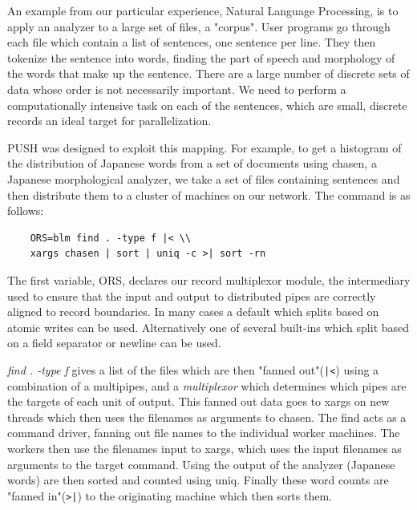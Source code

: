 An example from our particular experience, Natural Language Processing, is
to apply an analyzer to a large set of files, a "corpus". User programs go
through each file which contain a list of sentences, one sentence per line.
They then tokenize the sentence into words, finding the part of speech and
morphology of the words that make up the sentence.
There are a large number of discrete sets of data whose order is not 
necessarily important. We need to perform a computationally intensive task 
on each of the sentences, which are small, discrete records an ideal target 
for parallelization.

PUSH was designed to exploit this mapping. For example, to get a histogram of
the distribution of Japanese words from a set of documents using chasen,
a Japanese morphological analyzer, we take a set of files containing sentences
and then distribute them to a cluster of machines on our network. The command
is as follows:
%
%
\begin{verbatim}
    ORS=blm find . -type f |< \\
    xargs chasen | sort | uniq -c >| sort -rn
\end{verbatim}

The first variable, ORS, declares our record multiplexor module, 
the intermediary used to ensure that the input and output to 
distributed pipes are correctly aligned to record boundaries. 
In many cases a default which splits based on atomic writes can
be used.  Alternatively one of several built-ins which split based on 
a field separator or newline can be used.

\emph{find . -type f} gives a list of the files
which are then "fanned out"(\verb!|<!) using a combination
of a multipipes, and a \emph{multiplexor}
which determines which pipes are the targets of each unit of output.
This fanned out data goes to xargs on new threads
which then uses the filenames as arguments to
chasen. The find acts as a command driver, fanning out file names to the
individual worker machines. The workers then use the filenames input to
xargs, which uses the input filenames as arguments to the target command.
Using the output of the analyzer (Japanese words) are then sorted and 
counted using uniq.  Finally these word counts are "fanned in"(\verb!>|!) 
to the originating machine which then sorts them.

